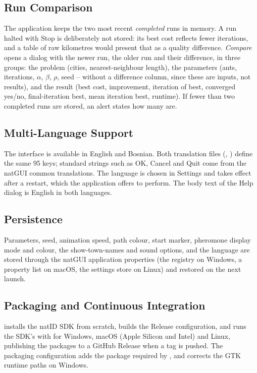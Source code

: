 \documentclass[11pt,a4paper]{article}
\begin{document}
\subsection{Run Comparison}\label{sec:compare}
The application keeps the two most recent \emph{completed} runs in memory. A run halted with Stop is
deliberately not stored: its best cost reflects fewer iterations, and a table of raw kilometres would
present that as a quality difference. \emph{Compare} opens a dialog with the newer run, the older run and
their difference, in three groups: the problem (cities, nearest-neighbour length), the parameters (ants,
iterations, $\alpha$, $\beta$, $\rho$, seed -- without a difference column, since these are inputs, not results),
and the result (best cost, improvement, iteration of best, converged yes/no, final-iteration best, mean
iteration best, runtime). If fewer than two completed runs are stored, an alert states how many are.

\subsection{Multi-Language Support}
The interface is available in English and Bosnian. Both translation files
(, ) define the same 95 keys; standard strings such as
OK, Cancel and Quit come from the natGUI common translations. The language is chosen in Settings and takes
effect after a restart, which the application offers to perform. The body text of the Help dialog is
English in both languages.

\subsection{Persistence}
Parameters, seed, animation speed, path colour, start marker, pheromone display mode and colour, the
show-town-names and sound options, and the language are stored through the natGUI application properties
(the registry on Windows, a property list on macOS, the settings store on Linux) and restored on the next
launch.

\subsection{Packaging and Continuous Integration}
 installs the natID SDK from scratch, builds the Release
configuration, and runs the SDK's  with 
for Windows, macOS (Apple Silicon and Intel) and Linux, publishing the packages to a GitHub Release when a
 tag is pushed. The packaging configuration adds the  package required by
, and  corrects the GTK runtime paths on Windows.
\end{document}
